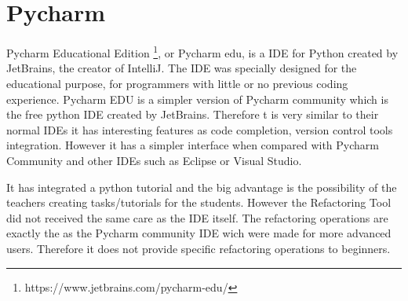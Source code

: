 \section{Pycharm}
Pycharm Educational Edition \footnote{https://www.jetbrains.com/pycharm-edu/},
 or Pycharm edu, is a IDE for Python created by JetBrains,
the creator of IntelliJ.
The IDE was specially designed for the educational purpose, for programmers
with little or no previous coding experience.
Pycharm EDU is a simpler version of Pycharm community which is the free
python IDE created by JetBrains.
Therefore t is very similar to their normal IDEs it has interesting features
as code completion, version control tools integration.
However it has a simpler interface when compared with
Pycharm Community and other IDEs such as Eclipse or Visual Studio. %

It has integrated a python tutorial and the big advantage is the possibility of
the teachers creating tasks/tutorials for the students.
However the Refactoring Tool did not received the same care as the IDE itself.
The refactoring operations are exactly the as the Pycharm community IDE wich were made
for more advanced users.
Therefore it does not provide specific refactoring operations to beginners.




